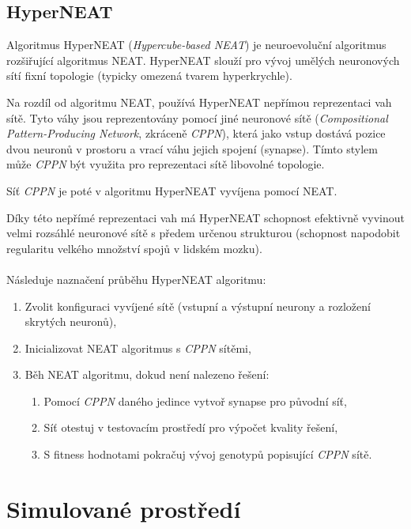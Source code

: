 \subsection{HyperNEAT} \label{NN - HyperNEAT}
Algoritmus HyperNEAT (\emph{Hypercube-based NEAT}) \citep{stanley2009hypercube}
\citep{eplex} je neuroevoluční algoritmus rozšiřující algoritmus NEAT.
HyperNEAT slouží pro vývoj umělých neuronových sítí fixní topologie (typicky
omezená tvarem hyperkrychle). 

Na rozdíl od algoritmu NEAT, používá HyperNEAT nepřímou
reprezentaci vah sítě. Tyto váhy jsou reprezentovány pomocí jiné neuronové
sítě (\emph{Compositional Pattern-Producing Network}, zkráceně \emph{CPPN}),
která jako vstup dostává pozice dvou neuronů v prostoru a vrací váhu jejich
spojení (synapse). Tímto stylem může \emph{CPPN} být využita pro reprezentaci
sítě libovolné topologie. 

Síť \emph{CPPN} je poté v algoritmu HyperNEAT vyvíjena pomocí NEAT.

Díky této nepřímé reprezentaci vah má HyperNEAT schopnost efektivně vyvinout
velmi rozsáhlé neuronové sítě s předem určenou strukturou (schopnost napodobit
regularitu velkého množství spojů v lidském mozku).

\paragraph{}
Následuje naznačení průběhu HyperNEAT algoritmu:
\begin{enumerate}
    \item Zvolit konfiguraci vyvíjené sítě (vstupní a výstupní neurony a
        rozložení skrytých neuronů),
    \item Inicializovat NEAT algoritmus s \emph{CPPN} sítěmi,
    \item Běh NEAT algoritmu, dokud není nalezeno řešení:
        \begin{enumerate}
            \item Pomocí \emph{CPPN} daného jedince vytvoř synapse pro původní
                síť,
            \item Síť otestuj v testovacím prostředí pro výpočet kvality
                řešení,
            \item S fitness hodnotami pokračuj vývoj genotypů popisující
                \emph{CPPN} sítě.
        \end{enumerate}
\end{enumerate}

\section{Simulované prostředí} \label{Simulované prostředí}

